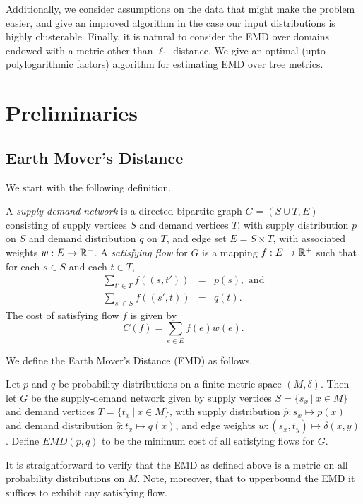 \documentclass[11pt]{article}
\newcommand{\ra}{\rightarrow}
\begin{document}
Additionally, we consider assumptions on the data that might make the problem
easier, and give an improved algorithm in the case our input distributions is highly
clusterable. Finally, it is natural to consider the EMD over domains endowed with a
metric other than $\ell_1$ distance. We give an optimal (upto polylogarithmic factors)
algorithm for estimating EMD over tree metrics.


\section{Preliminaries}

\subsection{Earth Mover's Distance}

We start with the following definition.

\begin{definition}
	A {\em supply-demand network} is a directed bipartite graph $G=(S\cup T,E)$
	consisting of supply vertices $S$ and demand vertices $T$, with supply
	distribution $p$ on $S$ and demand distribution $q$ on $T$, and edge set
	$E=S\times T$,  with associated weights $w:E \ra \R^+$. A {\em satisfying flow} for $G$ is a
	mapping $f:E\ra\R^+$ such that for each $s \in S$ and each $t \in T$,
	\begin{eqnarray*}
		\sum_{t'\in T} f((s,t')) &=& p(s),\text{ and}\\
		\sum_{s'\in S} f((s',t)) &=& q(t).
	\end{eqnarray*}
	The cost of satisfying flow $f$ is given by
	\[
		C(f) = \sum_{e\in E} f(e)w(e).
	\]	
\end{definition}

We define the Earth Mover's Distance (EMD) as follows.

\begin{definition}\label{def:flow}
	Let $p$ and $q$ be probability distributions on a finite metric space $(M,\delta)$.
	Then let $G$ be the supply-demand network given by supply vertices
	$S=\{s_x~|~x\in M\}$ and demand vertices $T=\{t_x~|~x\in M\}$, with supply distribution
	$\hat{p}: s_x \mapsto p(x)$ and demand distribution $\hat{q}: t_x \mapsto q(x)$, and
	edge weights $w: (s_x,t_y) \mapsto \delta(x,y)$. Define $EMD(p,q)$ to be the minimum
	cost of all satisfying flows for $G$.
\end{definition}

It is straightforward to verify that the EMD as defined above is a metric on all
probability distributions on $M$. Note, moreover, that to upperbound the EMD it
suffices to exhibit any satisfying flow. 
\end{document}
